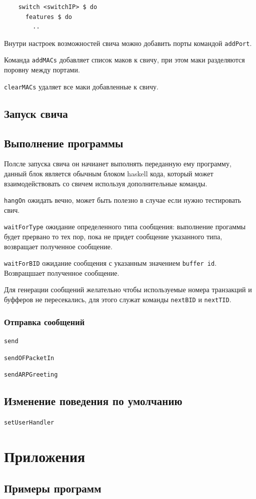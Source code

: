 \documentclass[9pt,a4paper]{article}
\begin{document}
\begin{lstlisting}
    switch <switchIP> $ do
      features $ do
        ..
\end{lstlisting}

Внутри настроек возможностей свича можно добавить порты командой \lstinline!addPort!.

Команда \lstinline!addMACs! добавляет список маков к свичу, при этом маки разделяются
поровну между портами.

\lstinline!clearMACs! удаляет все маки добавленные к свичу.


\subsection{Запуск свича}
\subsection{Выполнение программы}
Полсле запуска  свича он начианет выполнять переданную ему программу, данный блок 
является обычным блоком haskell кода, который может взаимодействовать со свичем
используя дополнительные команды.

\lstinline!hangOn! ожидать вечно, может быть полезно в случае если нужно тестировать
свич.

\lstinline!waitForType! ожидание определенного типа сообщения: выполнение прогаммы
будет прервано то тех пор, пока не придет сообщение указанного типа, возвращает 
полученное сообщение.

\lstinline!waitForBID! ожидание сообщения с указанным значением \texttt{buffer id}.
Возвращшает полученное сообщение.

Для генерации сообщений желательно чтобы используемые номера транзакций и буфферов 
не пересекались, для этого служат команды \lstinline!nextBID! и \lstinline!nextTID!.

\subsubsection{Отправка сообщений}

\lstinline!send!

\lstinline!sendOFPacketIn!

\lstinline!sendARPGreeting!

\subsection{Изменение поведения по умолчанию}

\lstinline!setUserHandler!

\section{Приложения}
\subsection{Примеры программ}
\end{document}
